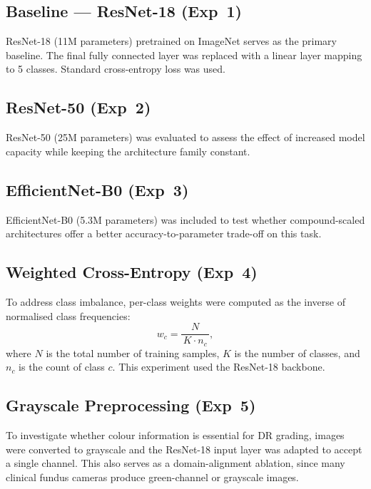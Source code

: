 \documentclass[12pt, a4paper]{article}
\begin{document}
\subsection{Baseline --- ResNet-18 (Exp~1)}
\label{ssec:exp1}

ResNet-18 \cite{TODO_he2016} (11M parameters) pretrained on ImageNet serves as
the primary baseline.
The final fully connected layer was replaced with a linear layer mapping to 5
classes.
Standard cross-entropy loss was used.

\subsection{ResNet-50 (Exp~2)}
\label{ssec:exp2}

ResNet-50 (25M parameters) was evaluated to assess the effect of increased model
capacity while keeping the architecture family constant.

\subsection{EfficientNet-B0 (Exp~3)}
\label{ssec:exp3}

EfficientNet-B0 (5.3M parameters) was included to test whether compound-scaled
architectures offer a better accuracy-to-parameter trade-off on this task.

\subsection{Weighted Cross-Entropy (Exp~4)}
\label{ssec:exp4}

To address class imbalance, per-class weights were computed as the inverse of
normalised class frequencies:
\begin{equation}
    w_c = \frac{N}{\,K \cdot n_c\,},
\end{equation}
where $N$ is the total number of training samples, $K$ is the number of classes,
and $n_c$ is the count of class $c$.
This experiment used the ResNet-18 backbone.

\subsection{Grayscale Preprocessing (Exp~5)}
\label{ssec:exp5}

To investigate whether colour information is essential for DR grading, images were
converted to grayscale and the ResNet-18 input layer was adapted to accept a
single channel.
This also serves as a domain-alignment ablation, since many clinical fundus cameras
produce green-channel or grayscale images.
\end{document}
